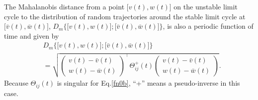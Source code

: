 The Mahalanobis distance from a point 
$\big[v(t),w(t)\big]$ on the unstable limit cycle to the 
distribution of random trajectories around the stable
limit cycle at $\big[\bar{v}(t),\bar{w}(t)\big]$, 
$D_m\Big\{\big[v(t),w(t)\big];\big[\bar{v}(t),\bar{w}(t)\big]\Big\}$, is also a
periodic function of time and given by
\begin{align}\label{fn62}\nonumber
&D_m\Big\{\big[v(t),w(t)\big];\big[\bar{v}(t),\bar{w}(t)\big]\Big\}\\
&=\sqrt{\left(\begin{array}{c}
 v(t)-\bar{v}(t)\\w(t)-\bar{w}(t)
\end{array}\right)^{\top}\Theta_{ij}^{+}(t)\left(\begin{array}{c}
 v(t)-\bar{v}(t)\\w(t)-\bar{w}(t)
\end{array}\right)}.
\end{align}
Because $\Theta_{ij}(t)$ is singular for Eq.\eqref{fn0b}, 
``+'' means a pseudo-inverse in this case.


